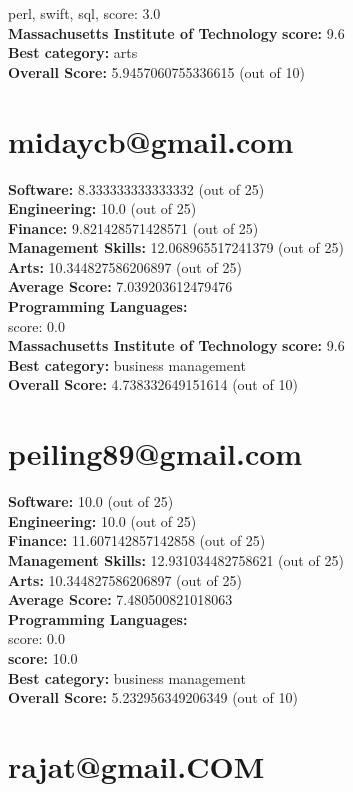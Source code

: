 \documentclass{article}
\begin{document}
perl, swift, sql, score: 3.0\\
\textbf{Massachusetts Institute of Technology} \textbf{score:} 9.6\\
\textbf{Best category: } arts\\
\textbf{Overall Score: }5.9457060755336615 (out of 10)\section{midaycb@gmail.com}
\textbf{Software:} 8.333333333333332 (out of 25)\\
\textbf{Engineering: } 10.0 (out of 25)\\
\textbf{Finance:} 9.821428571428571 (out of 25)\\
\textbf{Management Skills:} 12.068965517241379 (out of 25)\\
\textbf{Arts:} 10.344827586206897 (out of 25)\\
\textbf{Average Score: } 7.039203612479476\\
\textbf{Programming Languages:} \\
score: 0.0\\
\textbf{Massachusetts Institute of Technology} \textbf{score:} 9.6\\
\textbf{Best category: } business management\\
\textbf{Overall Score: }4.738332649151614 (out of 10)\section{peiling89@gmail.com}
\textbf{Software:} 10.0 (out of 25)\\
\textbf{Engineering: } 10.0 (out of 25)\\
\textbf{Finance:} 11.607142857142858 (out of 25)\\
\textbf{Management Skills:} 12.931034482758621 (out of 25)\\
\textbf{Arts:} 10.344827586206897 (out of 25)\\
\textbf{Average Score: } 7.480500821018063\\
\textbf{Programming Languages:} \\
score: 0.0\\
 \textbf{score:} 10.0\\
\textbf{Best category: } business management\\
\textbf{Overall Score: }5.232956349206349 (out of 10)\section{rajat@gmail.COM}
\end{document}
